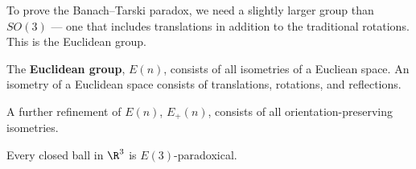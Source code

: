 To prove the Banach--Tarski paradox, we need a slightly larger group than $SO(3)$ --- one that includes translations in addition to the traditional rotations. This is the Euclidean group.
\begin{definition}
  The \textbf{Euclidean group}, $E(n)$, consists of all isometries of a Eucliean space. An isometry of a Euclidean space consists of translations, rotations, and reflections.\newline

  A further refinement of $E(n)$, $E_{+}(n)$, consists of all orientation-preserving isometries.
\end{definition}
\begin{corollary}
  Every closed ball in $\R^3$ is $E(3)$-paradoxical.
\end{corollary}

